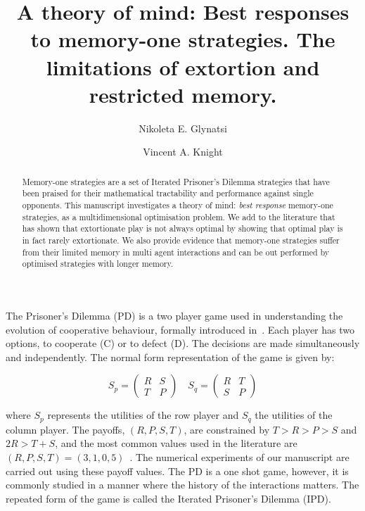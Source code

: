 \documentclass[10pt]{article}
\title{A theory of mind: Best responses to memory-one strategies. The limitations
of extortion and restricted memory.}
\author[1, *]{Nikoleta E. Glynatsi}
\author[1]{Vincent A. Knight}
\affil[1]{Cardiff University, School of Mathematics, Cardiff, United Kingdom}
\affil[*]{Corresponding author: Nikoleta E. Glynatsi, glynatsine@cardiff.ac.uk}
\date{}
\begin{document}
\maketitle

\newpage

\begin{abstract}
    Memory-one strategies are a set of Iterated Prisoner's Dilemma strategies
    that have been praised for their mathematical tractability and performance
    against single opponents. This manuscript investigates a theory of mind: \textit{best
    response} memory-one strategies, as a multidimensional
    optimisation problem. We add to the literature that has shown that
    extortionate play is not always optimal by showing that optimal play is in
    fact rarely extortionate. We
    also provide evidence that memory-one strategies suffer from their limited
    memory in multi agent interactions and can be out performed by
    optimised strategies with longer memory.
\end{abstract}

The Prisoner's Dilemma (PD) is a two player game used in understanding the
evolution of cooperative behaviour, formally introduced in~\cite{Flood1958}.
Each player has two options, to cooperate (C) or to defect (D). The decisions
are made simultaneously and independently. The normal form representation of the
game is given by:

\begin{equation}\label{equ:pd_definition}
    S_p =
    \begin{pmatrix}
        R & S  \\
        T & P
    \end{pmatrix}
    \quad
    S_q =
    \begin{pmatrix}
        R & T  \\
        S & P
    \end{pmatrix}
\end{equation}

where \(S_p\) represents the utilities of the row player and \(S_q\) the
utilities of the column player. The payoffs, \((R, P, S, T)\), are constrained
by \(T > R > P > S\) and \(2R > T + S\), and the most common values used in the
literature are \((R, P, S, T) = (3, 1, 0, 5)\)~\cite{Axelrod1981}.
The numerical experiments of our manuscript are carried out using these
payoff values.
The PD is a one shot game, however, it is commonly studied in a manner where the
history of the interactions matters. The repeated form of the game is called the
Iterated Prisoner's Dilemma (IPD).
\end{document}
